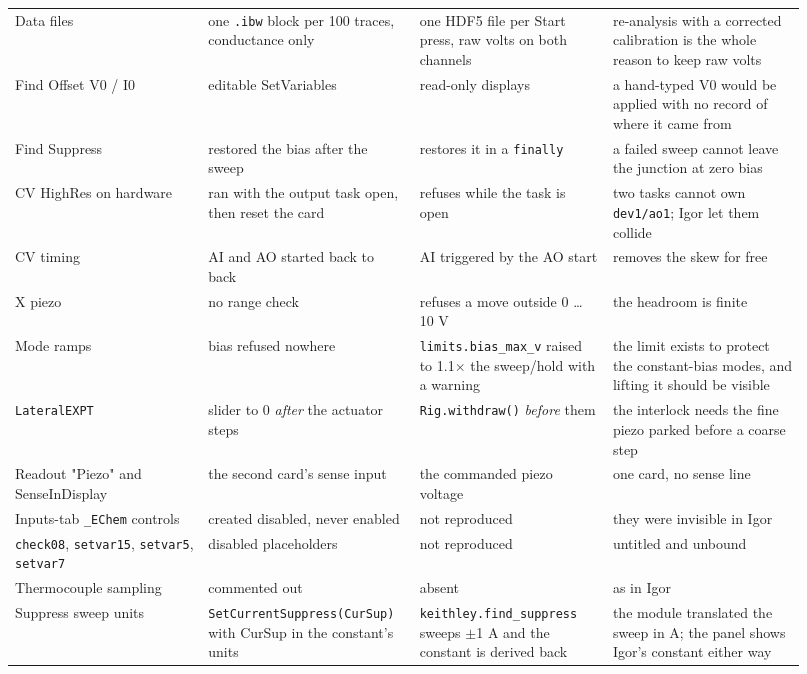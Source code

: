 \begin{longtable}{@{}>{\raggedright\arraybackslash}p{0.230\linewidth}>{\raggedright\arraybackslash}p{0.230\linewidth}>{\raggedright\arraybackslash}p{0.230\linewidth}>{\raggedright\arraybackslash}p{0.230\linewidth}@{}}
Data files & one \texttt{.\discretionary{}{}{}ibw} block per 100 traces, conductance only & one HDF5 file per Start press, raw volts on both channels & re-analysis with a corrected calibration is the whole reason to keep raw volts \\
Find Offset V0 / I0 & editable SetVariables & read-only displays & a hand-typed V0 would be applied with no record of where it came from \\
Find Suppress & restored the bias after the sweep & restores it in a \texttt{finally} & a failed sweep cannot leave the junction at zero bias \\
CV HighRes on hardware & ran with the output task open, then reset the card & refuses while the task is open & two tasks cannot own \texttt{dev1/\discretionary{}{}{}ao1}; Igor let them collide \\
CV timing & AI and AO started back to back & AI triggered by the AO start & removes the skew for free \\
X piezo & no range check & refuses a move outside 0 \ldots{} 10 V & the headroom is finite \\
Mode ramps & bias refused nowhere & \texttt{limits.\discretionary{}{}{}bias\_\discretionary{}{}{}max\_\discretionary{}{}{}v} raised to 1.1$\times$ the sweep/hold with a warning & the limit exists to protect the constant-bias modes, and lifting it should be visible \\
\texttt{Lateral\discretionary{}{}{}EXPT} & slider to 0 \emph{after} the actuator steps & \texttt{Rig.\discretionary{}{}{}withdraw()} \emph{before} them & the interlock needs the fine piezo parked before a coarse step \\
Readout "Piezo" and SenseInDisplay & the second card's sense input & the commanded piezo voltage & one card, no sense line \\
Inputs-tab \texttt{\_\discretionary{}{}{}EChem} controls & created disabled, never enabled & not reproduced & they were invisible in Igor \\
\texttt{check08}, \texttt{setvar15}, \texttt{setvar5}, \texttt{setvar7} & disabled placeholders & not reproduced & untitled and unbound \\
Thermocouple sampling & commented out & absent & as in Igor \\
Suppress sweep units & \texttt{Set\discretionary{}{}{}Current\discretionary{}{}{}Suppress(Cur\discretionary{}{}{}Sup)} with CurSup in the constant's units & \texttt{keithley.\discretionary{}{}{}find\_\discretionary{}{}{}suppress} sweeps $\pm$1 \textmu{}A and the constant is derived back & the module translated the sweep in \textmu{}A; the panel shows Igor's constant either way \\
\bottomrule
\end{longtable}
\normalsize

